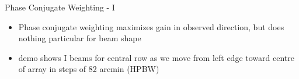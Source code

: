 \documentclass[pdf,azure,slideColor,colorBG]{prosper}
\begin{document}
\begin{slide}{Phase Conjugate Weighting - I}
\begin{small}
\begin{itemize}
\item Phase conjugate weighting maximizes gain in observed
direction, but does nothing particular for beam shape
\item demo shows I beams for central row as we move from left edge toward centre of array in steps of 82 arcmin (HPBW)
\end{itemize}
\end {small}
{\centering
{}
}
\end{slide}
\end{document}
